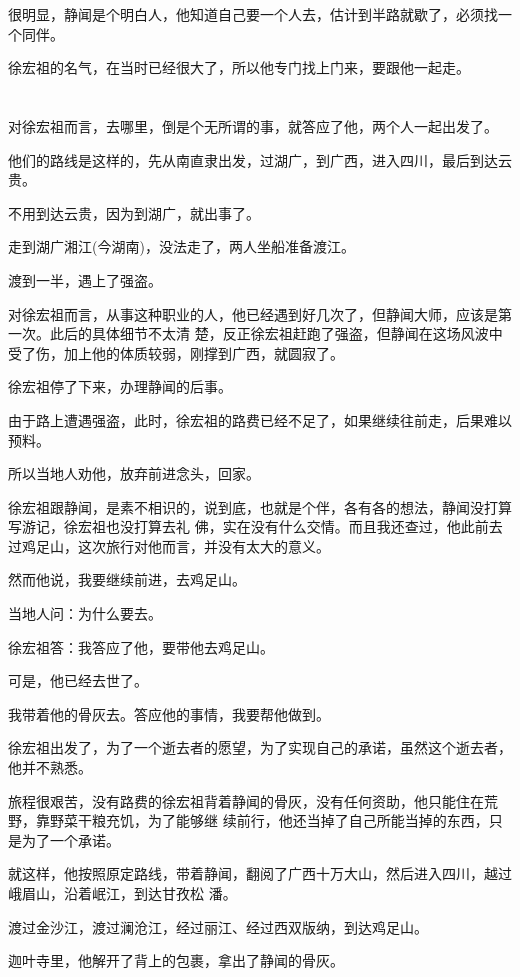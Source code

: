 \documentclass[11pt,a4paper,onecolumn]{article}
\begin{document}
很明显，静闻是个明白人，他知道自己要一个人去，估计到半路就歇了，必须找一个同伴。

徐宏祖的名气，在当时已经很大了，所以他专门找上门来，要跟他一起走。

\section[\thesection]{}

对徐宏祖而言，去哪里，倒是个无所谓的事，就答应了他，两个人一起出发了。

他们的路线是这样的，先从南直隶出发，过湖广，到广西，进入四川，最后到达云贵。

不用到达云贵，因为到湖广，就出事了。

走到湖广湘江(今湖南)，没法走了，两人坐船准备渡江。

渡到一半，遇上了强盗。

对徐宏祖而言，从事这种职业的人，他已经遇到好几次了，但静闻大师，应该是第一次。此后的具体细节不太清
楚，反正徐宏祖赶跑了强盗，但静闻在这场风波中受了伤，加上他的体质较弱，刚撑到广西，就圆寂了。

徐宏祖停了下来，办理静闻的后事。

由于路上遭遇强盗，此时，徐宏祖的路费已经不足了，如果继续往前走，后果难以预料。

所以当地人劝他，放弃前进念头，回家。

徐宏祖跟静闻，是素不相识的，说到底，也就是个伴，各有各的想法，静闻没打算写游记，徐宏祖也没打算去礼
佛，实在没有什么交情。而且我还查过，他此前去过鸡足山，这次旅行对他而言，并没有太大的意义。

然而他说，我要继续前进，去鸡足山。

当地人问：为什么要去。

徐宏祖答：我答应了他，要带他去鸡足山。

可是，他已经去世了。

我带着他的骨灰去。答应他的事情，我要帮他做到。

徐宏祖出发了，为了一个逝去者的愿望，为了实现自己的承诺，虽然这个逝去者，他并不熟悉。

旅程很艰苦，没有路费的徐宏祖背着静闻的骨灰，没有任何资助，他只能住在荒野，靠野菜干粮充饥，为了能够继
续前行，他还当掉了自己所能当掉的东西，只是为了一个承诺。

就这样，他按照原定路线，带着静闻，翻阅了广西十万大山，然后进入四川，越过峨眉山，沿着岷江，到达甘孜松
潘。

渡过金沙江，渡过澜沧江，经过丽江、经过西双版纳，到达鸡足山。

迦叶寺里，他解开了背上的包裹，拿出了静闻的骨灰。
\end{document}
